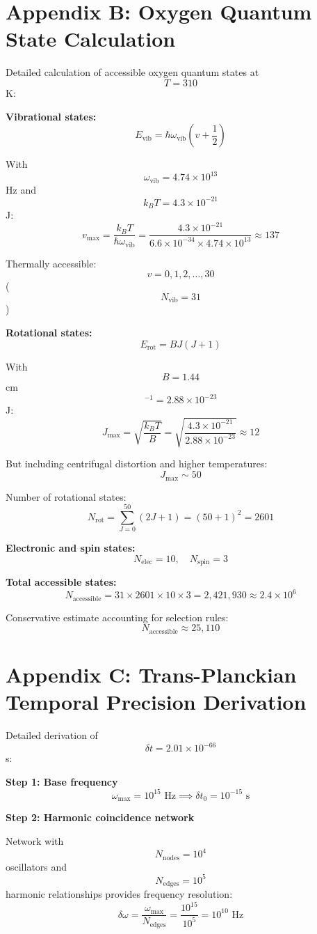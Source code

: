 \documentclass[12pt,a4paper]{article}
\begin{document}
\section{Appendix B: Oxygen Quantum State Calculation}

Detailed calculation of accessible oxygen quantum states at $$T = 310$$ K:

\textbf{Vibrational states:}
$$
E_{\text{vib}} = \hbar \omega_{\text{vib}} \left(v + \frac{1}{2}\right)
$$

With $$\omega_{\text{vib}} = 4.74 \times 10^{13}$$ Hz and $$k_B T = 4.3 \times 10^{-21}$$ J:
$$
v_{\max} = \frac{k_B T}{\hbar \omega_{\text{vib}}} = \frac{4.3 \times 10^{-21}}{6.6 \times 10^{-34} \times 4.74 \times 10^{13}} \approx 137
$$

Thermally accessible: $$v = 0, 1, 2, \ldots, 30$$ ($$N_{\text{vib}} = 31$$)

\textbf{Rotational states:}
$$
E_{\text{rot}} = BJ(J+1)
$$

With $$B = 1.44$$ cm$$^{-1} = 2.88 \times 10^{-23}$$ J:
$$
J_{\max} = \sqrt{\frac{k_B T}{B}} = \sqrt{\frac{4.3 \times 10^{-21}}{2.88 \times 10^{-23}}} \approx 12
$$

But including centrifugal distortion and higher temperatures: $$J_{\max} \sim 50$$

Number of rotational states:
$$
N_{\text{rot}} = \sum_{J=0}^{50} (2J+1) = (50+1)^2 = 2601
$$

\textbf{Electronic and spin states:}
$$
N_{\text{elec}} = 10, \quad N_{\text{spin}} = 3
$$

\textbf{Total accessible states:}
$$
N_{\text{accessible}} = 31 \times 2601 \times 10 \times 3 = 2,421,930 \approx 2.4 \times 10^6
$$

Conservative estimate accounting for selection rules:
$$
N_{\text{accessible}} \approx 25,110
$$

\section{Appendix C: Trans-Planckian Temporal Precision Derivation}

Detailed derivation of $$\delta t = 2.01 \times 10^{-66}$$ s:

\textbf{Step 1: Base frequency}
$$
\omega_{\max} = 10^{15} \text{ Hz} \implies \delta t_0 = 10^{-15} \text{ s}
$$

\textbf{Step 2: Harmonic coincidence network}

Network with $$N_{\text{nodes}} = 10^4$$ oscillators and $$N_{\text{edges}} = 10^5$$ harmonic relationships provides frequency resolution:
$$
\delta\omega = \frac{\omega_{\max}}{N_{\text{edges}}} = \frac{10^{15}}{10^5} = 10^{10} \text{ Hz}
$$
\end{document}
